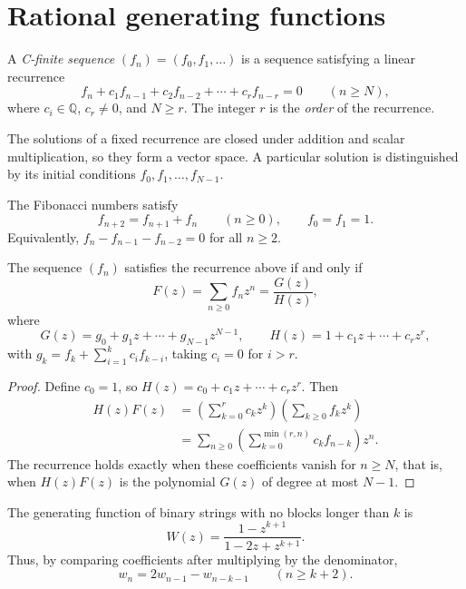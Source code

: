 \section{Rational generating functions}
\begin{definition}
A \textit{C-finite sequence} $(f_n)=(f_0,f_1,\ldots)$ is a sequence satisfying a linear recurrence
\[
f_n+c_1f_{n-1}+c_2f_{n-2}+\cdots+c_rf_{n-r}=0
\qquad(n\ge N),
\]
where $c_i\in\mathbb Q$, $c_r\ne0$, and $N\ge r$. The integer $r$ is the \textit{order} of the recurrence.
\end{definition}
The solutions of a fixed recurrence are closed under addition and scalar multiplication, so they form a vector space. A particular solution is distinguished by its initial conditions $f_0,f_1,\ldots,f_{N-1}$.
\begin{example}
The Fibonacci numbers satisfy
\[
f_{n+2}=f_{n+1}+f_n\qquad(n\ge0),\qquad f_0=f_1=1.
\]
Equivalently, $f_n-f_{n-1}-f_{n-2}=0$ for all $n\ge2$.
\end{example}
\begin{theorem}
The sequence $(f_n)$ satisfies the recurrence above if and only if
\[
F(z)=\sum_{n\ge0}f_nz^n=\frac{G(z)}{H(z)},
\]
where
\[
G(z)=g_0+g_1z+\cdots+g_{N-1}z^{N-1},
\qquad H(z)=1+c_1z+\cdots+c_rz^r,
\]
with $\displaystyle g_k=f_k+\sum_{i=1}^k c_if_{k-i}$, taking $c_i=0$ for $i>r$.
\end{theorem}
\begin{proof}
Define $c_0=1$, so $H(z)=c_0+c_1z+\cdots+c_rz^r$. Then
\begin{align*}
H(z)F(z)
&=\left(\sum_{k=0}^r c_kz^k\right)
\left(\sum_{k\ge0}f_kz^k\right)\\
&=\sum_{n\ge0}\left(\sum_{k=0}^{\min(r,n)}c_kf_{n-k}\right)z^n.
\end{align*}
The recurrence holds exactly when these coefficients vanish for $n\ge N$, that is, when $H(z)F(z)$ is the polynomial $G(z)$ of degree at most $N-1$.
\end{proof}
\begin{example}
The generating function of binary strings with no blocks longer than $k$ is
\[
W(z)=\frac{1-z^{k+1}}{1-2z+z^{k+1}}.
\]
Thus, by comparing coefficients after multiplying by the denominator,
\[
w_n=2w_{n-1}-w_{n-k-1}\qquad(n\ge k+2).
\]
\end{example}

